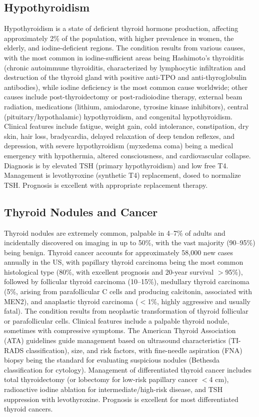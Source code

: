 \subsection{Hypothyroidism}
\label{sec:Hypothyroidism}
Hypothyroidism is a state of deficient thyroid hormone production, affecting approximately 2\% of the population, with higher prevalence in women, the elderly, and iodine-deficient regions. The condition results from various causes, with the most common in iodine-sufficient areas being Hashimoto's thyroiditis (chronic autoimmune thyroiditis, characterized by lymphocytic infiltration and destruction of the thyroid gland with positive anti-TPO and anti-thyroglobulin antibodies), while iodine deficiency is the most common cause worldwide; other causes include post-thyroidectomy or post-radioiodine therapy, external beam radiation, medications (lithium, amiodarone, tyrosine kinase inhibitors), central (pituitary/hypothalamic) hypothyroidism, and congenital hypothyroidism. Clinical features include fatigue, weight gain, cold intolerance, constipation, dry skin, hair loss, bradycardia, delayed relaxation of deep tendon reflexes, and depression, with severe hypothyroidism (myxedema coma) being a medical emergency with hypothermia, altered consciousness, and cardiovascular collapse. Diagnosis is by elevated TSH (primary hypothyroidism) and low free T4. Management is levothyroxine (synthetic T4) replacement, dosed to normalize TSH. Prognosis is excellent with appropriate replacement therapy.

\subsection{Thyroid Nodules and Cancer}
\label{sec:Thyroid Nodules and Cancer}
Thyroid nodules are extremely common, palpable in 4--7\% of adults and incidentally discovered on imaging in up to 50\%, with the vast majority (90--95\%) being benign. Thyroid cancer accounts for approximately 58,000 new cases annually in the US, with papillary thyroid carcinoma being the most common histological type (80\%, with excellent prognosis and 20-year survival $>$95\%), followed by follicular thyroid carcinoma (10--15\%), medullary thyroid carcinoma (5\%, arising from parafollicular C cells and producing calcitonin, associated with MEN2), and anaplastic thyroid carcinoma ($<$1\%, highly aggressive and usually fatal). The condition results from neoplastic transformation of thyroid follicular or parafollicular cells. Clinical features include a palpable thyroid nodule, sometimes with compressive symptoms. The American Thyroid Association (ATA) guidelines guide management based on ultrasound characteristics (TI-RADS classification), size, and risk factors, with fine-needle aspiration (FNA) biopsy being the standard for evaluating suspicious nodules (Bethesda classification for cytology). Management of differentiated thyroid cancer includes total thyroidectomy (or lobectomy for low-risk papillary cancer $<$4 cm), radioactive iodine ablation for intermediate/high-risk disease, and TSH suppression with levothyroxine. Prognosis is excellent for most differentiated thyroid cancers.

